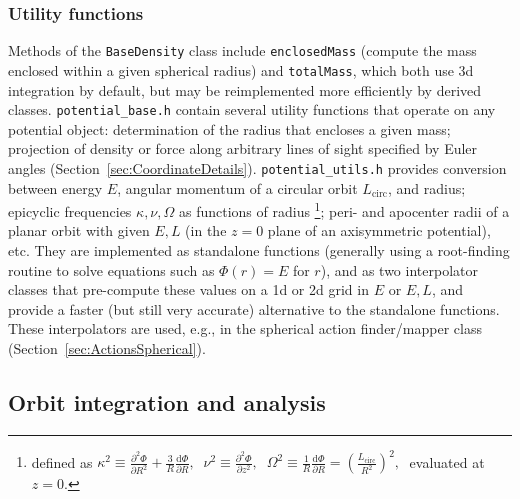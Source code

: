 \documentclass[12pt]{article}
\renewcommand{\d}{\mathrm{d}}
\newcommand{\D}{\partial}
\begin{document}
\subsubsection{Utility functions}  \label{sec:PotentialUtility}

Methods of the \texttt{BaseDensity} class include \texttt{enclosedMass} (compute the mass enclosed within a given spherical radius) and \texttt{totalMass}, which both use 3d integration by default, but may be reimplemented more efficiently by derived classes. \texttt{potential_base.h} contain several utility functions that operate on any potential object: determination of the radius that encloses a given mass; projection of density or force along arbitrary lines of sight specified by Euler angles (Section~\ref{sec:CoordinateDetails}). \texttt{potential_utils.h} provides conversion between energy $E$, angular momentum of a circular orbit $L_\mathrm{circ}$, and radius; epicyclic frequencies $\kappa,\nu,\Omega$ as functions of radius%
\footnote{defined as $\displaystyle \kappa^2\equiv \frac{\D ^2\Phi}{\D R^2} + \frac 3 R \frac{\d\Phi}{\D R},\;\; \nu^2\equiv \frac{\D ^2\Phi}{\D z^2},\;\; \Omega^2\equiv \frac 1 R \frac{\d\Phi}{\D R} = \left(\frac{L_\mathrm{circ}}{R^2}\right)^2,\;$ evaluated at $z=0$.};
peri- and apocenter radii of a planar orbit with given $E,L$ (in the $z=0$ plane of an axisymmetric potential), etc. They are implemented as standalone functions (generally using a root-finding routine to solve equations such as $\Phi(r)=E$ for $r$), and as two interpolator classes that pre-compute these values on a 1d or 2d grid in $E$ or $E,L$, and provide a faster (but still very accurate) alternative to the standalone functions. These interpolators are used, e.g., in the spherical action finder/mapper class (Section~\ref{sec:ActionsSpherical}).


\subsection{Orbit integration and analysis}  \label{sec:Orbits}
\end{document}
